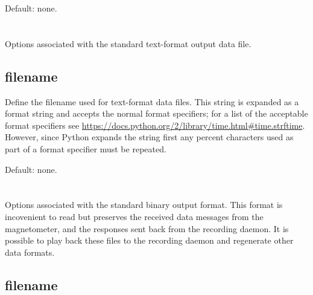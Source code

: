 Default: none.


\section{\code{[awnettextdata]}}

Options associated with the standard text-format output data file.

\subsection{filename}
\label{sec:config-data-filename}
Define the filename used for text-format data files. This string is
expanded as a  format string and accepts the normal
 format specifiers; for a list of the acceptable format
specifiers see
\url{https://docs.python.org/2/library/time.html#time.strftime}. However,
since Python expands the string first any percent characters used as
part of a  format specifier must be repeated.

Default: none.


\section{\code{[awpacket]}}
Options associated with the standard binary output format. This format
is incovenient to read but preserves the received data messages from
the magnetometer, and the responses sent back from the recording
daemon. It is possible to play back these files to the recording
daemon and regenerate other data formats.

\subsection{filename}

